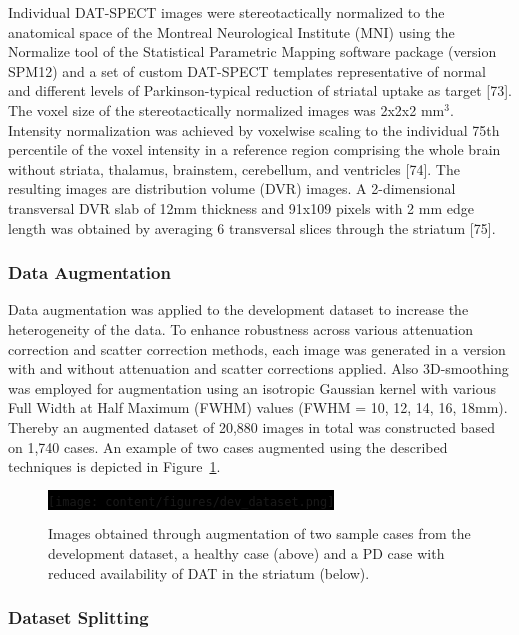 

Individual DAT-SPECT images were stereotactically normalized to the anatomical space of the Montreal Neurological Institute (MNI) 
using the Normalize tool of the Statistical Parametric Mapping software package (version SPM12) and a set of custom DAT-SPECT templates 
representative of normal and different levels of Parkinson-typical reduction of striatal uptake as target [73]. 
The voxel size of the stereotactically normalized images was 2x2x2 mm$^{3}$. 
Intensity normalization was achieved by voxelwise scaling to the individual 75th percentile of the voxel intensity in a reference region 
comprising the whole brain without striata, thalamus, brainstem, cerebellum, and ventricles [74]. 
The resulting images are distribution volume (DVR) images. 
A 2-dimensional transversal DVR slab of 12mm thickness and 91x109 pixels with 2 mm edge length was obtained by averaging 6 transversal slices through the striatum [75]. 

\subsubsection{Data Augmentation}
\label{subsec:augment}

Data augmentation was applied to the development dataset to increase the heterogeneity of the data.
To enhance robustness across various attenuation correction and scatter correction methods, 
each image was generated in a version with and without attenuation and scatter corrections applied.
Also 3D-smoothing was employed for augmentation using an isotropic Gaussian kernel with various 
Full Width at Half Maximum (FWHM) values (FWHM = 10, 12, 14, 16, 18mm).
Thereby an augmented dataset of 20,880 images in total was constructed based on 1,740 cases.
An example of two cases augmented using the described techniques is depicted in Figure~\ref{fig:dev_dataset}.

\begin{figure}[t]
    \centering
    \colorbox{black}{%
     \texttt{[image: content/figures/dev\_dataset.png]}%
     }
    \caption{Images obtained through augmentation of two sample cases from the development dataset, 
    a healthy case (above) and a PD case with reduced availability of DAT in the striatum (below).} 
    \label{fig:dev_dataset}
  \end{figure} 

\subsubsection{Dataset Splitting}
\label{subsec:split}

